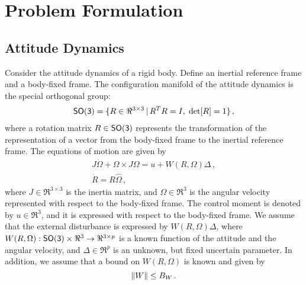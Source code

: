 \documentclass[letterpaper, 10 pt, conference]{ieeeconf}  %
\begin{document}
\section{Problem Formulation}\label{sec:prob_form}
\subsection{Attitude Dynamics}\label{sec:att_dyn}
Consider the attitude dynamics of a rigid body. 
Define an inertial reference frame and a body-fixed frame. 
The configuration manifold of the attitude dynamics is the special orthogonal group:
\begin{align*}
	\mathsf{SO(3)} = \{R\in\Re^{3\times 3}\,|\, R^TR=I,\;\mathrm{det}[R]=1\} \, ,
\end{align*}
where a rotation matrix $R\in\mathsf{SO(3)}$ represents the transformation of the representation of a vector from the body-fixed frame to the inertial reference frame. 
The equations of motion are given by
\begin{gather}
	J\dot\Omega + \Omega\times J\Omega = u+W(R,\Omega)\Delta \, ,\label{eqn:Wdot}\\
	\dot R = R\hat\Omega \, ,\label{eqn:Rdot}
\end{gather}
where $J\in\Re^{3\times 3}$ is the inertia matrix, and $\Omega\in\Re^3$ is the angular velocity represented with respect to the body-fixed frame. 
The control moment is denoted by $u\in\Re^3$, and it is expressed with respect to the body-fixed frame. 
We assume that the external disturbance is expressed by $W(R,\Omega)\Delta$, where $W(R,\Omega):\mathsf{SO(3)}\times\Re^3\rightarrow \Re^{3\times p}$ is a known function of the attitude and the angular velocity, and $\Delta\in\Re^p$ is an unknown, but fixed uncertain parameter.
In addition, we assume that a bound on \( W(R, \Omega) \) is known and given by
\begin{equation}
	\left\| W \right\| \leq B_W \, . \label{eqn:W_bound}
\end{equation}
\end{document}
